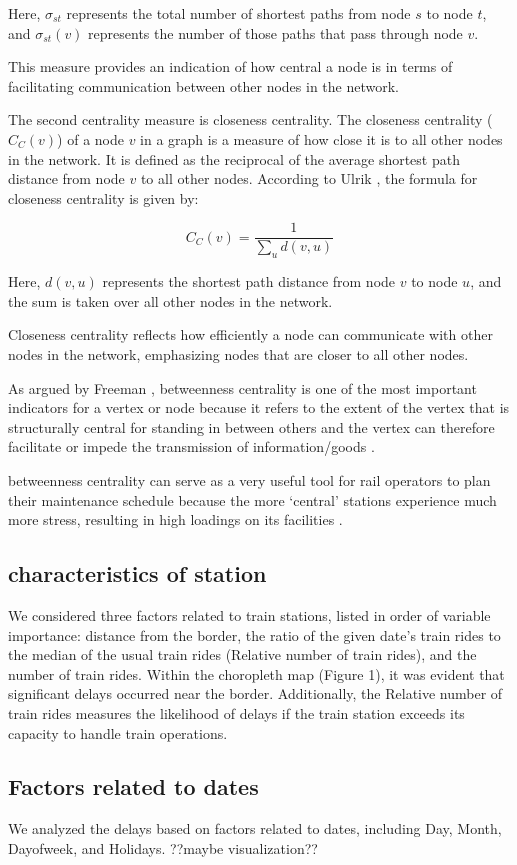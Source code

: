\documentclass{article}
\theoremstyle{plain}
\theoremstyle{definition}
\theoremstyle{remark}
\begin{document}
Here, $\sigma_{st}$ represents the total number of shortest paths from node $s$ to node $t$, and $\sigma_{st}(v)$ represents the number of those paths that pass through node $v$.

This measure provides an indication of how central a node is in terms of facilitating communication between other nodes in the network.

The second centrality measure is closeness centrality. The closeness centrality ($C_C(v)$) of a node $v$ in a graph is a measure of how close it is to all other nodes in the network. It is defined as the reciprocal of the average shortest path distance from node $v$ to all other nodes. According to Ulrik \cite{generic_comp}, the formula for closeness centrality is given by:

\begin{equation}
C_C(v) = \frac{1}{\sum_{u} d(v, u)}
\end{equation}

Here, $d(v, u)$ represents the shortest path distance from node $v$ to node $u$, and the sum is taken over all other nodes in the network.

Closeness centrality reflects how efficiently a node can communicate with other nodes in the network, emphasizing nodes that are closer to all other nodes.




As argued by Freeman \cite{betweenness}, betweenness centrality is one of the most important indicators for a vertex or node because it refers to the extent of the vertex that is structurally central for standing in between others and the vertex can therefore facilitate or impede the transmission of information/goods \cite{centrality}.

betweenness centrality can serve as a very useful tool for rail operators to plan their maintenance schedule because the more ‘central’ stations experience much more stress, resulting in high loadings on its facilities \cite{centrality}.

\subsection{{characteristics of station}}

We considered three factors related to train stations, listed in order of variable importance: distance from the border, the ratio of the given date's train rides to the median of the usual train rides (Relative number of train rides), and the number of train rides. Within the choropleth map (Figure 1), it was evident that significant delays occurred near the border. Additionally, the Relative number of train rides measures the likelihood of delays if the train station exceeds its capacity to handle train operations.

\subsection{{Factors related to dates}}

We analyzed the delays based on factors related to dates, including Day, Month, Dayofweek, and Holidays.
??maybe visualization??





\end{document}
